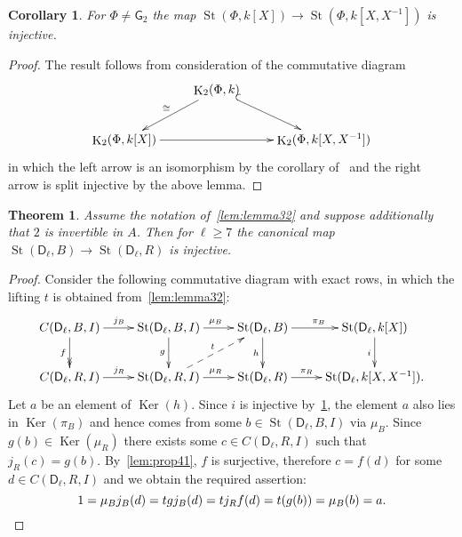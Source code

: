 \documentclass[oneside, 8pt]{amsart}
\newtheorem{theorem}{Theorem}
\newtheorem{corollary}{Corollary}
\theoremstyle{remark}
\theoremstyle{definition}
\DeclareMathOperator{\Ker}{Ker}
\DeclareMathOperator{\St}{St}
\DeclareMathOperator{\K}{K}
\newcommand{\rD}{\mathsf{D}}
\newcommand{\rG}{\mathsf{G}}
\numberwithin{equation}{section}
\begin{document}
\begin{corollary} \label{field-injectivity} For $\Phi\neq\rG_2$ the map $\St(\Phi, k[X]) \to \St(\Phi, k[X, X^{-1}])$ is injective. \end{corollary}
\begin{proof} The result follows from consideration of the commutative diagram
\[\xymatrix{ & \K_2(\Phi, k) \ar[dl]_{\cong} \ar@{^{(}->}[dr] & \\
               \K_2(\Phi, k[X]) \ar[rr] &               & \K_2(\Phi, k[X, X^{-1}])} \]
in which the left arrow is an isomorphism by the corollary of~\cite[Satz~1]{Re75} and the right arrow is split injective by the above lemma. \end{proof}
\begin{theorem} \label{thm41}
Assume the notation of~\cref{lem:lemma32} and suppose additionally that $2$ is invertible in $A$.
Then for $\ell \geq 7$ the canonical map $\St(\rD_\ell, B) \to \St(\rD_\ell, R)$ is injective.
\end{theorem}
\begin{proof}
 Consider the following commutative diagram with exact rows, in which the lifting $t$ is obtained from~\cref{lem:lemma32}:
\begin{equation*} \xymatrix{
 C(\rD_\ell, B, I) \ar[r]^{j_B} \ar@{->>}[d]_{f} & \St(\rD_\ell, B, I) \ar[r]^{\mu_B} \ar[d]_{g} &
 \St(\rD_\ell, B) \ar[r]^{\pi_B} \ar[d]_{h} & \St(\rD_\ell, k[X]) \ar[d]_{i} \\
 C(\rD_\ell, R, I) \ar[r]^{j_R}         & \St(\rD_\ell, R, I) \ar[r]^{\mu_R} \ar@{-->}[ur]^{t}&
 \St(\rD_\ell, R) \ar[r]^-{\pi_R}        & \St(\rD_\ell, k[X, X^{-1}]).
}\end{equation*}
Let $a$ be an element of $\Ker(h)$. Since $i$ is injective by~\cref{field-injectivity}, the element $a$
 also lies in $\Ker(\pi_B)$ and hence comes from some $b \in \St(\rD_\ell, B, I)$ via $\mu_B$.
Since $g(b) \in \Ker(\mu_R)$ there exists some $c \in C(\rD_\ell, R, I)$ such that $j_R(c) = g(b)$. 
By~\cref{lem:prop41}, $f$ is surjective, therefore $c = f(d)$ for some $d \in C(\rD_\ell, R, I)$ and we obtain the required assertion:
 \[ 1 = \mu_Bj_B(d) = tgj_B(d) = tj_Rf(d) =t(g(b)) = \mu_B(b) = a. \qedhere \]
\end{proof}
\end{document}
